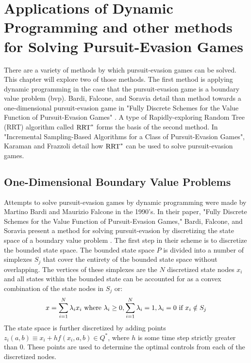 \chapter{Applications of Dynamic Programming and other methods for Solving Pursuit-Evasion Games}\label{chp:app}
There are a variety of methods by which pursuit-evasion games can be solved. This chapter will explore two of those methods. The first method is applying dynamic programming in the case that the pursuit-evasion game is a boundary value problem (bvp). Bardi, Falcone, and Soravia detail than method towards a one-dimensional pursuit-evasion game in "Fully Discrete Schemes for the Value Function of Pursuit-Evasion Games" \cite{bardi2}. A type of Rapidly-exploring Random Tree (RRT) algorithm called $\textnormal{RRT}^*$ forms the basis of the second method. In "Incremental Sampling-Based Algorithms for a Class of Pursuit-Evasion Games", Karaman and Frazzoli detail how $\textnormal{RRT}^*$ can be used to solve pursuit-evasion games.  

\section{One-Dimensional Boundary Value Problems}

Attempts to solve pursuit-evasion games by dynamic programming were made by Martino Bardi and Maurizio Falcone in the 1990's. In their paper, "Fully Discrete Schemes for the Value Function of Pursuit-Evasion Games," Bardi, Falcone, and Soravia present a method for solving pursuit-evasion by discretizing the state space of a boundary value problem \cite{bardi2}. The first step in their scheme is to discretize the bounded state space. The bounded state space $P$ is divided into a number of simplexes ${S_j}$ that cover the entirety of the bounded state space without overlapping. The vertices of these simplexes are the $N$ discretized state nodes $x_i$ and all states within the bounded state can be accounted for as a convex combination of the state nodes in $S_j$ or:
$$ x= \sum_{i=1}^{N} \lambda_i x_i \textnormal{ where } \lambda_i \ge 0,  \sum_{i=1}^{N}\lambda_i=1,\lambda_i = 0 \textnormal{ if } x_i\notin S_j$$
The state space is further discretized by adding points $z_i(a,b) \equiv x_i+hf(x_i,a,b) \in Q^*$, where $h$ is some time step strictly greater than 0. These points are used to determine the optimal controls from each of the discretized nodes.

